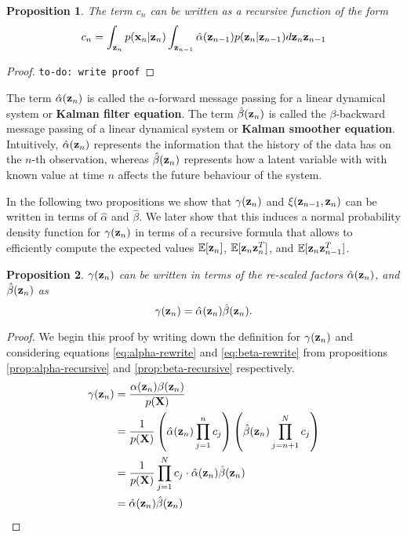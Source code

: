 \documentclass[11pt]{article}
\numberwithin{equation}{section}
\newcommand{\x}{{\bf x}}
\newcommand{\z}{{\bf z}}
\newtheorem{proposition}{Proposition}[section]
\begin{document}
\begin{proposition}
	The term $c_n$ can be written as a recursive function of the form
	\begin{equation}
		c_n = \int_{\z_n} p(\x_n \vert \z_n) \int_{\z_{n-1}} \hat\alpha(\z_{n-1})p(\z_n \vert \z_{n-1}) d\z_n\z_{n-1}
	\end{equation}
\end{proposition}

\begin{proof}
	\texttt{to-do: write proof}
\end{proof}

The term $\hat\alpha(\z_n)$ is called the $\alpha$-forward message passing for a linear dynamical system or \textbf{Kalman filter equation}.  The term $\hat\beta(\z_n)$ is called the $\beta$-backward message passing of a linear dynamical system or \textbf{Kalman smoother equation}. Intuitively, $\hat\alpha(\z_n)$ represents the information that the history of the data has on the $n$-th observation, whereas $\hat\beta(\z_n)$ represents how a latent variable with with known value at time $n$ affects the future behaviour of the system.

In the following two propositions we show that $\gamma(\z_n)$ and $\xi(\z_{n-1}, \z_{n})$ can be written in terms of $\hat\alpha$ and $\hat\beta$. We later show that this induces a normal probability density function for $\gamma(\z_n)$ in terms of a recursive formula that allows to efficiently compute the expected values $\mathbb{E}[\z_n]$, $\mathbb{E}[\z_n\z_{n}^{T}]$, and  $\mathbb{E}[\z_n\z_{n-1}^{T}]$.


\begin{proposition}
	$\gamma(\z_n)$ can be written in terms of the re-scaled factors $\hat\alpha(\z_n)$, and $\hat\beta(\z_n)$ as
	\begin{equation}
		\gamma(\z_n) = \hat\alpha(\z_n)\hat\beta(\z_n).
	\end{equation}
\end{proposition}

\begin{proof} We begin this proof by writing down the definition for $\gamma(\z_n)$ and considering equations \ref{eq:alpha-rewrite} and \ref{eq:beta-rewrite} from propositions \ref{prop:alpha-recursive} and \ref{prop:beta-recursive} respectively.
	\begin{align}
		\gamma(\z_n) &= \frac{\alpha(\z_n) \beta(\z_n)}{p({\bf X})} \\
		&= \frac{1}{p({\bf X})}\left(\hat\alpha(\z_n) \prod_{j=1}^n c_j\right)\left(\hat\beta(\z_n) \prod_{j={n+1}}^N c_j\right) \\
		&= \frac{1}{p(\bf X)} \prod_{j=1}^N c_j \cdot \hat\alpha(\z_n) \hat\beta(\z_n)\\
		&= \hat\alpha(\z_n) \hat\beta(\z_n)
	\end{align}
\end{proof}
\end{document}
